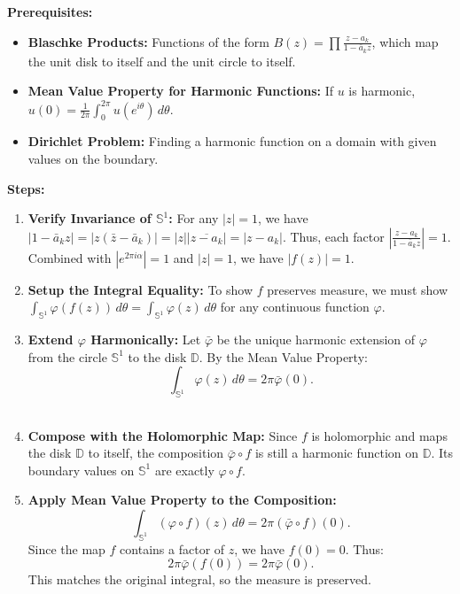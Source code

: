 \begin{solution}
\textbf{Prerequisites:} 
\begin{itemize}
    \item \textbf{Blaschke Products:} Functions of the form $B(z) = \prod \frac{z-a_k}{1-\bar{a}_k z}$, which map the unit disk to itself and the unit circle to itself.
    \item \textbf{Mean Value Property for Harmonic Functions:} If $u$ is harmonic, $u(0) = \frac{1}{2\pi} \int_0^{2\pi} u(e^{i\theta}) \, d\theta$.
    \item \textbf{Dirichlet Problem:} Finding a harmonic function on a domain with given values on the boundary.
\end{itemize}

\bigskip

\textbf{Steps:}
\begin{enumerate}
    \item \textbf{Verify Invariance of $\mathbb{S}^1$:} For any $|z|=1$, we have $|1-\bar{a}_k z| = |z(\bar{z}-\bar{a}_k)| = |z||\overline{z-a_k}| = |z-a_k|$.
    Thus, each factor $\left| \frac{z-a_k}{1-\bar{a}_k z} \right| = 1$. Combined with $|e^{2\pi i \alpha}| = 1$ and $|z|=1$, we have $|f(z)|=1$. \\[2ex]

    \item \textbf{Setup the Integral Equality:} To show $f$ preserves measure, we must show $\int_{\mathbb{S}^1} \varphi(f(z)) \, d\theta = \int_{\mathbb{S}^1} \varphi(z) \, d\theta$ for any continuous function $\varphi$. \\[2ex]

    \item \textbf{Extend $\varphi$ Harmonically:} Let $\bar{\varphi}$ be the unique harmonic extension of $\varphi$ from the circle $\mathbb{S}^1$ to the disk $\mathbb{D}$. By the Mean Value Property:
    \[ \int_{\mathbb{S}^1} \varphi(z) \, d\theta = 2\pi \bar{\varphi}(0). \] \\[2ex]

    \item \textbf{Compose with the Holomorphic Map:} Since $f$ is holomorphic and maps the disk $\mathbb{D}$ to itself, the composition $\bar{\varphi} \circ f$ is still a harmonic function on $\mathbb{D}$. Its boundary values on $\mathbb{S}^1$ are exactly $\varphi \circ f$. \\[2ex]

    \item \textbf{Apply Mean Value Property to the Composition:}
    \[ \int_{\mathbb{S}^1} (\varphi \circ f)(z) \, d\theta = 2\pi (\bar{\varphi} \circ f)(0). \]
    Since the map $f$ contains a factor of $z$, we have $f(0) = 0$. Thus:
    \[ 2\pi \bar{\varphi}(f(0)) = 2\pi \bar{\varphi}(0). \]
    This matches the original integral, so the measure is preserved.
\end{enumerate}


\end{solution}
